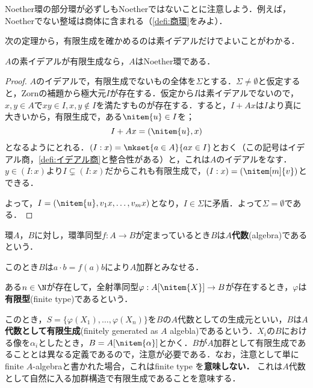 Noether環の部分環が必ずしもNoetherではないことに注意しよう．例えば，Noetherでない整域は商体に含まれる（\ref{defi:商環}をみよ）．

次の定理から，有限生成を確かめるのは素イデアルだけでよいことがわかる．
\begin{thm}[I.S.Cohen]
	$A$の素イデアルが有限生成なら，$A$はNoether環である．
\end{thm}
\begin{proof}
	$A$のイデアルで，有限生成でないもの全体を$\Sigma$とする．$\Sigma\neq\emptyset$と仮定すると，Zornの補題から極大元$I$が存在する．仮定から$I$は素イデアルでないので，$x,y\in A$で$xy\in I,x,y\not\in I$を満たすものが存在する．すると，$I+Ax$は$I$より真に大きいから，有限生成で，ある$\nitem{u}\in I$を；
	\[I+Ax=(\nitem{u},x)\]
	となるようにとれる．$(I:x)=\mkset{a\in A}{ax\in I}$とおく（この記号はイデアル商，\ref{defi:イデアル商}と整合性がある）と，これは$A$のイデアルをなす．$y\in (I:x)$より$I\subsetneq(I:x)$だからこれも有限生成で，$(I:x)=(\nitem[m]{v})$とできる．
	
	よって，$I=(\nitem{u},v_1x,\dots,v_mx)$となり，$I\in\Sigma$に矛盾．よって$\Sigma=\emptyset$である．
\end{proof}

\begin{defi}[$A$代数]
	環$A，B$に対し，環準同型$f:A\to B$が定まっているとき$B$は$A$\textbf{代数}(algebra)であるという．
\end{defi}

このとき$B$は$a\cdot b=f(a)b$により$A$加群とみなせる．

\begin{defi}[有限型]
	ある$n\in\N$が存在して，全射準同型$\varphi:A[\nitem{X}]\to B$が存在するとき，$\varphi$は\textbf{有限型}(finite type)であるという．
\end{defi}

このとき，$S=\{\varphi(X_1),\dots,\varphi(X_n)\}$を$B$の$A$代数としての生成元といい，$B$は$A$\textbf{代数として有限生成}(finitely generated as $A$ algebla)であるという．$X_i$の$B$における像を$\alpha_i$としたとき，$B=A[\nitem{\alpha}]$とかく．$B$が$A$加群として有限生成であることとは異なる定義であるので，注意が必要である．なお，注意として単にfinite $A$-algebraと書かれた場合，これはfinite type を\textbf{意味しない．} これは$A$代数として自然に入る加群構造で有限生成であることを意味する．


